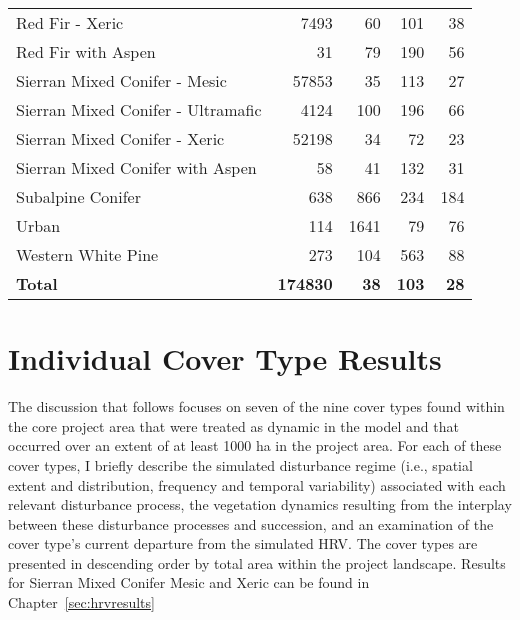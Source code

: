 \begin{table}[!htbp]
\begin{tabular}{@{}lrrrr@{}}
Red Fir - Xeric                              & 7493     &   60      & 101      &  38 \\
Red Fir with Aspen                           & 31       &   79      & 190      &  56 \\
Sierran Mixed Conifer - Mesic                & 57853    &   35      & 113      &  27 \\
Sierran Mixed Conifer - Ultramafic           & 4124     &  100      & 196      &  66 \\
Sierran Mixed Conifer - Xeric                & 52198    &   34      &  72      &  23 \\
Sierran Mixed Conifer with Aspen             & 58       &   41      & 132      &  31 \\
Subalpine Conifer                            & 638      &  866      & 234      & 184 \\
Urban                                        & 114      & 1641      &  79      &  76 \\
Western White Pine                           & 273      &  104      & 563      &  88 \\
\textbf{Total}       			& \textbf{174830}    & \textbf{38}   & \textbf{103}   & \textbf{28}  \\ 
\bottomrule
\end{tabular}
\end{table}



\section{Individual Cover Type Results}
\label{sec:indiv_cov_results}


The discussion that follows focuses on seven of the nine cover types found within the core project area that were treated as dynamic in the model and that occurred over an extent of at least 1000 ha in the project area. For each of these cover types, I briefly describe the simulated disturbance regime (i.e., spatial extent and distribution, frequency and temporal variability) associated with each relevant disturbance process, the vegetation dynamics resulting from the interplay between these disturbance processes and succession, and an examination of the cover type’s current departure from the simulated HRV. The cover types are presented in descending order by total area within the project landscape. Results for Sierran Mixed Conifer Mesic and Xeric can be found in Chapter~\ref{sec:hrvresults}

